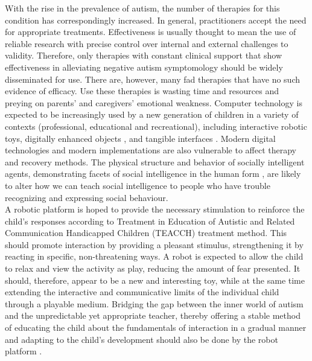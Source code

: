 With the rise in the prevalence of autism, the number of therapies for this condition 
has correspondingly increased. In general, practitioners accept the need for appropriate 
treatments. Effectiveness is usually thought to mean the use of reliable research with precise 
control over internal and external challenges to validity. Therefore, only therapies with 
constant clinical support that show effectiveness in alleviating negative autism symptomology 
should be widely disseminated for use. There are, however, many fad therapies that have no 
such evidence of efficacy. Use these therapies is wasting time and resources and preying on 
parents' and caregivers' emotional weakness. \cite{zane2008cost} Computer technology is expected 
to be increasingly used by a new generation of children in a variety of contexts (professional, 
educational and recreational), including interactive robotic toys, digitally enhanced objects 
, and tangible interfaces \cite{laurel2013computers, tapscott1998growing, cassell2000barbie, druin2000robots}. 
Modern digital technologies and modern implementations are also vulnerable to affect therapy 
and recovery methods. The physical structure and behavior of socially intelligent agents, 
demonstrating facets of social intelligence in the human form \cite{dautenhahn1998art}, are 
likely to alter how we can teach social intelligence to people who have trouble recognizing 
and expressing social behaviour.\\

A robotic platform is hoped to provide the necessary stimulation to reinforce the child's responses
according to Treatment in Education of Autistic and Related Communication Handicapped Children 
(TEACCH) treatment method. This should promote interaction by providing a pleasant stimulus, 
strengthening it by reacting in specific, non-threatening ways. A robot is expected to allow the child 
to relax and view the activity as play, reducing the amount of fear presented. It should, therefore, 
appear to be a new and interesting toy, while at the same time extending the interactive and communicative 
limits of the individual child through a playable medium. Bridging the gap between the inner 
world of autism and the unpredictable yet appropriate teacher, thereby offering a stable method of 
educating the child about the fundamentals of interaction in a gradual manner and adapting to the 
child's development should also be done by the robot platform \cite{werry1999applying}.\\

